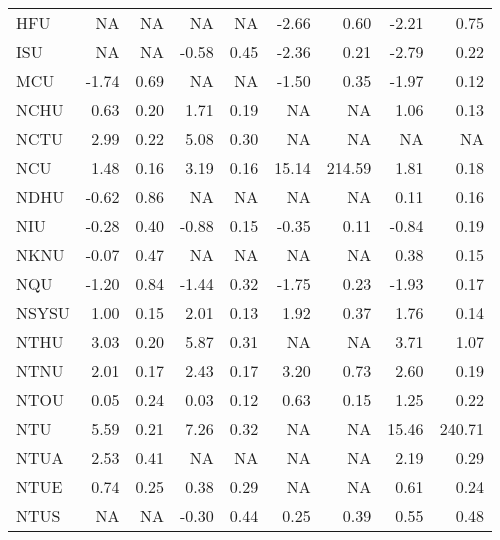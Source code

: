 \begin{longtable}[t]{lrrrrrrrr}
\hspace{1em}HFU & NA & NA & NA & NA & -2.66 & 0.60 & -2.21 & 0.75\\
\hspace{1em}ISU & NA & NA & -0.58 & 0.45 & -2.36 & 0.21 & -2.79 & 0.22\\
\hspace{1em}MCU & -1.74 & 0.69 & NA & NA & -1.50 & 0.35 & -1.97 & 0.12\\
\hspace{1em}NCHU & 0.63 & 0.20 & 1.71 & 0.19 & NA & NA & 1.06 & 0.13\\
\hspace{1em}NCTU & 2.99 & 0.22 & 5.08 & 0.30 & NA & NA & NA & NA\\
\hspace{1em}NCU & 1.48 & 0.16 & 3.19 & 0.16 & 15.14 & 214.59 & 1.81 & 0.18\\
\hspace{1em}NDHU & -0.62 & 0.86 & NA & NA & NA & NA & 0.11 & 0.16\\
\hspace{1em}NIU & -0.28 & 0.40 & -0.88 & 0.15 & -0.35 & 0.11 & -0.84 & 0.19\\
\hspace{1em}NKNU & -0.07 & 0.47 & NA & NA & NA & NA & 0.38 & 0.15\\
\hspace{1em}NQU & -1.20 & 0.84 & -1.44 & 0.32 & -1.75 & 0.23 & -1.93 & 0.17\\
\hspace{1em}NSYSU & 1.00 & 0.15 & 2.01 & 0.13 & 1.92 & 0.37 & 1.76 & 0.14\\
\hspace{1em}NTHU & 3.03 & 0.20 & 5.87 & 0.31 & NA & NA & 3.71 & 1.07\\
\hspace{1em}NTNU & 2.01 & 0.17 & 2.43 & 0.17 & 3.20 & 0.73 & 2.60 & 0.19\\
\hspace{1em}NTOU & 0.05 & 0.24 & 0.03 & 0.12 & 0.63 & 0.15 & 1.25 & 0.22\\
\hspace{1em}NTU & 5.59 & 0.21 & 7.26 & 0.32 & NA & NA & 15.46 & 240.71\\
\hspace{1em}NTUA & 2.53 & 0.41 & NA & NA & NA & NA & 2.19 & 0.29\\
\hspace{1em}NTUE & 0.74 & 0.25 & 0.38 & 0.29 & NA & NA & 0.61 & 0.24\\
\hspace{1em}NTUS & NA & NA & -0.30 & 0.44 & 0.25 & 0.39 & 0.55 & 0.48\\

\end{longtable}
